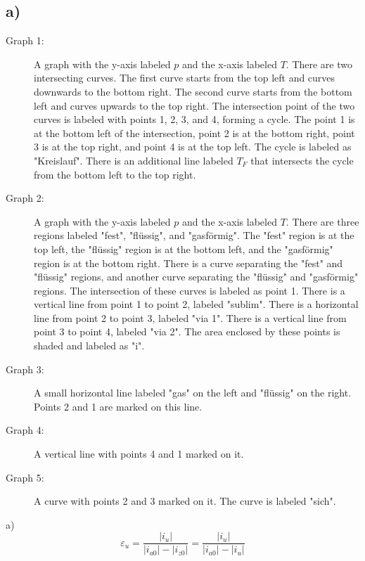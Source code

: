

\subsection*{a)}

\begin{description}
    \item[Graph 1:] A graph with the y-axis labeled \( p \) and the x-axis labeled \( T \). There are two intersecting curves. The first curve starts from the top left and curves downwards to the bottom right. The second curve starts from the bottom left and curves upwards to the top right. The intersection point of the two curves is labeled with points 1, 2, 3, and 4, forming a cycle. The point 1 is at the bottom left of the intersection, point 2 is at the bottom right, point 3 is at the top right, and point 4 is at the top left. The cycle is labeled as "Kreislauf". There is an additional line labeled \( T_F \) that intersects the cycle from the bottom left to the top right.
    
    \item[Graph 2:] A graph with the y-axis labeled \( p \) and the x-axis labeled \( T \). There are three regions labeled "fest", "flüssig", and "gasförmig". The "fest" region is at the top left, the "flüssig" region is at the bottom left, and the "gasförmig" region is at the bottom right. There is a curve separating the "fest" and "flüssig" regions, and another curve separating the "flüssig" and "gasförmig" regions. The intersection of these curves is labeled as point 1. There is a vertical line from point 1 to point 2, labeled "sublim". There is a horizontal line from point 2 to point 3, labeled "via 1". There is a vertical line from point 3 to point 4, labeled "via 2". The area enclosed by these points is shaded and labeled as "i".
    
    \item[Graph 3:] A small horizontal line labeled "gas" on the left and "flüssig" on the right. Points 2 and 1 are marked on this line.
    
    \item[Graph 4:] A vertical line with points 4 and 1 marked on it.
    
    \item[Graph 5:] A curve with points 2 and 3 marked on it. The curve is labeled "sich".
\end{description}

a) \[
\varepsilon_{u} = \frac{|i_{u}|}{|i_{a0}| - |i_{z0}|} = \frac{|i_{u}|}{|i_{a0}| - |i_{u}|}
\]